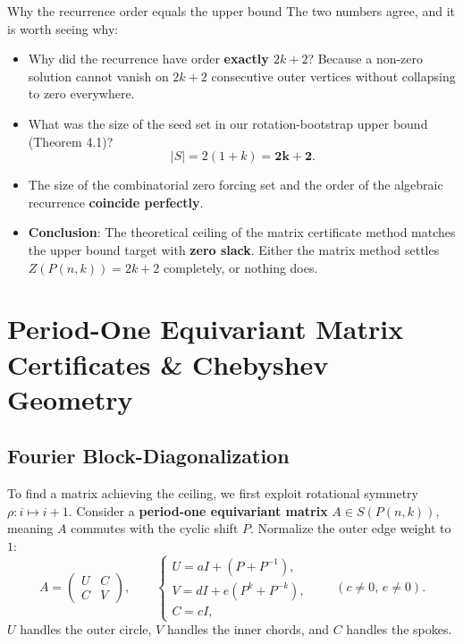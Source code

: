 \documentclass[11pt]{article}
\begin{document}
\begin{callbox}{Why the recurrence order equals the upper bound}
The two numbers agree, and it is worth seeing why:
\begin{itemize}[leftmargin=*,nosep]
  \item Why did the recurrence have order \textbf{exactly $2k+2$}? Because a non-zero solution cannot vanish on $2k+2$ consecutive outer vertices without collapsing to zero everywhere.
  \item What was the size of the seed set in our rotation-bootstrap upper bound (Theorem 4.1)? 
  \begin{equation}
    |S| = 2(1 + k) = \mathbf{2k + 2}.
  \end{equation}
  \item The size of the combinatorial zero forcing set and the order of the algebraic recurrence \textbf{coincide perfectly}.
  \item \textbf{Conclusion}: The theoretical ceiling of the matrix certificate method matches the upper bound target with \textbf{zero slack}. Either the matrix method settles $Z(P(n,k)) = 2k+2$ completely, or nothing does.
\end{itemize}
\end{callbox}

\newpage

\section{Period-One Equivariant Matrix Certificates \& Chebyshev Geometry}

\subsection{Fourier Block-Diagonalization}

To find a matrix achieving the ceiling, we first exploit rotational symmetry $\rho: i \mapsto i+1$.
Consider a \textbf{period-one equivariant matrix} $A \in S(P(n,k))$, meaning $A$ commutes with the cyclic shift $P$. 
Normalize the outer edge weight to $1$:
\begin{equation}
  A = \begin{pmatrix} U & C \\ C & V \end{pmatrix}, \qquad
  \begin{cases}
    U = a I + (P + P^{-1}), \\
    V = d I + e (P^k + P^{-k}), \\
    C = c I,
  \end{cases}
  \qquad (c \ne 0, \, e \ne 0).
\end{equation}
$U$ handles the outer circle, $V$ handles the inner chords, and $C$ handles the spokes.
\end{document}
